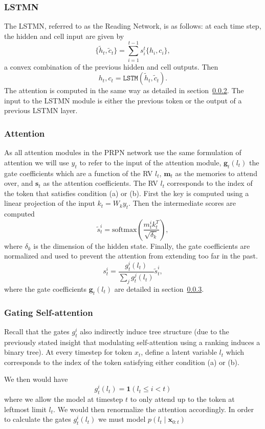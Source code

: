 \documentclass{article}
\newcommand{\bx}{\mathbf{x}}
\begin{document}
\subsubsection{LSTMN}
\label{subsec:lstmn}
The LSTMN, referred to as the Reading Network, is as follows:
at each time step, the hidden and cell input are given by
$$\{\tilde{h}_t,\tilde{c}_t\} = \sum_{i=1}^{t-1} s_i^t\{h_i,c_i\},$$
a convex combination of the previous hidden and cell outputs.
Then $$h_t,c_t = \texttt{LSTM}(\tilde{h}_t,\tilde{c}_t).$$
The attention is computed in the same way as detailed in section~\ref{subsec:attn}.
The input to the LSTMN module is either the previous token or the
output of a previous LSTMN layer.

\subsubsection{Attention}
\label{subsec:attn}
As all attention modules in the PRPN network use the same formulation of attention we will use 
$y_t$ to refer to the input of the attention module,
$\bm{g}_t(l_t)$ the gate coefficients which are a function of the RV $l_t$,
$\bm{m}_t$ as the memories to attend over, and $\bm{s}_t$ as the attention coefficients.
The RV $l_t$ corresponds to the index of the token that satisfies condition (a) or (b).
First the key is computed using a linear projection of the input $k_t = W_ky_t$.
Then the intermediate scores are computed
$$\tilde{s}^i_t = \textrm{softmax}\left(\frac{m^i_tk^T_t}{\sqrt{\delta_k}}\right),$$
where $\delta_k$ is the dimension of the hidden state.
Finally, the gate coefficients are normalized and used to prevent the attention from
extending too far in the past.
$$s^i_t = \frac{g^i_t(l_t)}{\sum_jg^j_t(l_t)}\tilde{s}^i_t,$$
where the gate coefficients $\bm{g}_t(l_t)$ are detailed in section~\ref{subsec:gates}.

\subsubsection{Gating Self-attention}
\label{subsec:gates}
Recall that the gates $g^i_t$ also indirectly induce tree structure
(due to the previously stated insight that modulating self-attention
using a ranking induces a binary tree).
At every timestep for token $x_t$,
\citet{shen2018prpn} define a latent variable $l_t$ which corresponds to the index of the 
token satisfying either condition (a) or (b).

We then would have $$g^i_t(l_t) = \mathbf{1}(l_t \le i < t)$$
where we allow the model at timestep $t$ to only attend up to the token at leftmost limit $l_t$.
We would then renormalize the attention accordingly.
In order to calculate the gates $g^i_t(l_t)$ we must model $p(l_t\mid\bx_{0:t})$ 
\end{document}
